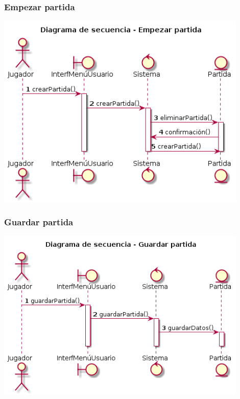 \subsubsection{Empezar partida}
\begin{center}
  \includegraphics[width=0.9\textwidth]{./imatges/jugador/Empezar_partida.png}
  \end{center}

\subsubsection{Guardar partida}
\begin{center}
  \includegraphics[width=0.9\textwidth]{./imatges/jugador/Guardar_partida.png}
  \end{center}

